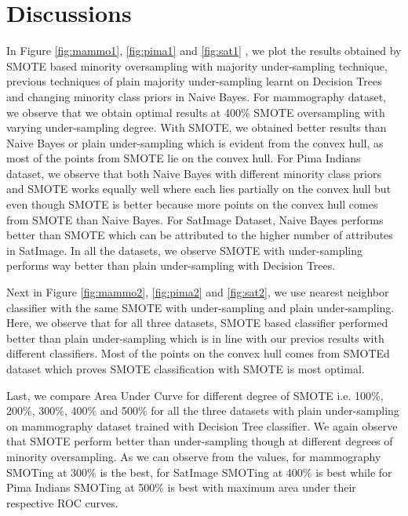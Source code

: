 \documentclass[10pt,journal,compsoc]{IEEEtran}
\begin{document}
\section{Discussions}
\label{sec:discuss}
In Figure \ref{fig:mammo1}, \ref{fig:pima1} and \ref{fig:sat1} , we plot the results obtained by SMOTE based minority oversampling with majority under-sampling technique, previous techniques of plain majority under-sampling learnt on Decision Trees and changing minority class priors in Naive Bayes.
For mammography dataset, we observe that we obtain optimal results at 400\% SMOTE oversampling with varying under-sampling degree. 
With SMOTE, we obtained better results than Naive Bayes or plain under-sampling which is evident from the convex hull, as most of the points from SMOTE lie on the convex hull.
For Pima Indians dataset,  we observe that both Naive Bayes with different minority class priors and SMOTE works equally well where each lies partially on the convex hull but even though SMOTE is better because more points on the convex hull comes from SMOTE than Naive Bayes. 
For SatImage Dataset, Naive Bayes performs better than SMOTE which can be attributed to the higher number of attributes in SatImage.
In all the datasets, we observe SMOTE with under-sampling performs way better than plain under-sampling with Decision Trees.

Next in Figure \ref{fig:mammo2}, \ref{fig:pima2} and \ref{fig:sat2}, we use nearest neighbor classifier with the same SMOTE with under-sampling and plain under-sampling. 
Here, we observe that for all three datasets, SMOTE based classifier performed better than plain under-sampling which is in line with our previos results with different classifiers. 
Most of the points on the convex hull comes from SMOTEd dataset which proves SMOTE classification with SMOTE is most optimal.

Last, we compare Area Under Curve for different degree of SMOTE i.e. 100\%, 200\%, 300\%, 400\% and 500\% for all the three datasets with plain under-sampling on mammography dataset trained with Decision Tree classifier. 
We again observe that SMOTE perform better than under-sampling though at different degrees of minority oversampling. 
As we can observe from the values, for mammography SMOTing at 300\% is the best, for SatImage SMOTing at 400\% is best while for Pima Indians SMOTing at 500\% is best with maximum area under their respective ROC curves.
\end{document}
